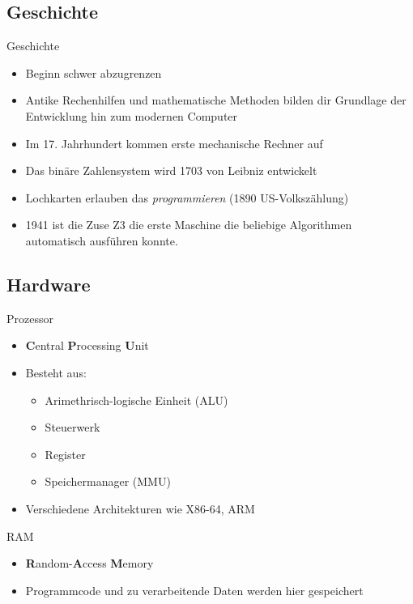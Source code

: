 \documentclass[aspectratio=43]{beamer}
\begin{document}
\subsection{Geschichte}
\begin{frame} 

	\begin{block}{Geschichte} 
	\begin{itemize}
	\item Beginn schwer abzugrenzen
	\item Antike Rechenhilfen und mathematische Methoden bilden dir Grundlage der Entwicklung hin zum modernen Computer
	\item Im 17. Jahrhundert kommen erste mechanische Rechner auf
	\item Das binäre Zahlensystem wird 1703 von Leibniz entwickelt
	\item Lochkarten erlauben das \textit{programmieren}
	\newline (1890 US-Volkszählung)
	\item 1941 ist die Zuse Z3 die erste Maschine die beliebige Algorithmen automatisch ausführen konnte.
	\end{itemize}
	\end{block}


\end{frame}

\subsection{Hardware}
\begin{frame} 

	\begin{block}{Prozessor} 
	\begin{itemize}
	\item \textbf{C}entral \textbf{P}rocessing \textbf{U}nit
	\item Besteht aus:
	\begin{itemize}
	 \item Arimethrisch-logische Einheit (ALU)
	 \item Steuerwerk
	 \item Register
	 \item Speichermanager (MMU)
	
	\end{itemize}
	\item Verschiedene Architekturen wie X86-64, ARM
	\end{itemize}
	\end{block}

	\begin{block}{RAM} 
	\begin{itemize}
	\item \textbf{R}andom-\textbf{A}ccess \textbf{M}emory
	\item Programmcode und zu verarbeitende Daten werden hier gespeichert
	\end{itemize}
	\end{block}
\end{frame}
\end{document}
